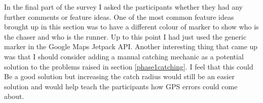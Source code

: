 \documentclass{l4proj}
\begin{document}
In the final part of the survey I asked the participants whether they had any further comments or feature ideas. One of the most common
feature ideas brought up in this section was to have a different colour of marker to show who is the chaser and who is the runner. Up to this
point I had just used the generic marker in the Google Maps Jetpack API. Another interesting thing that came up was that I should consider
adding a manual catching mechanic as a potential solution to the problems raised in section \ref{phase1catching}. I feel that this could Be
a good solution but increasing the catch radius would still be an easier solution and would help teach the participants how GPS errors could
come about.

\begin{table}[]
    \centering
    \caption{At the start of the survey I gave my participants 4 statements and asked them whether they agreed or disagreed with it. This table shows the results of that survey}
    \label{tab:agree}
\end{table}
\end{document}

